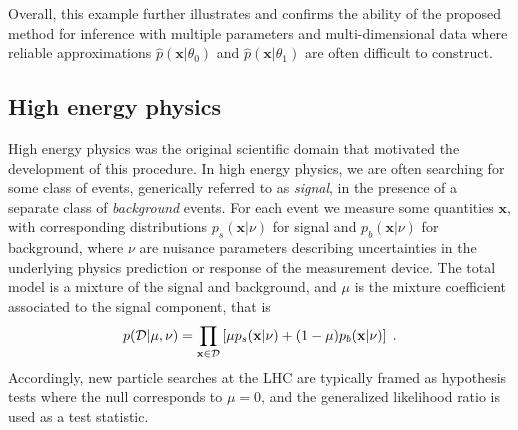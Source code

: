 \documentclass[12pt]{article}
\numberwithin{equation}{section}
\theoremstyle{plain}
\begin{document}
Overall, this example further illustrates and confirms the ability
of the proposed method for inference with multiple parameters and multi-dimensional data where
reliable approximations $\hat p(\mathbf{x}|\theta_0)$ and $\hat p(\mathbf{x}|\theta_1)$
are often difficult to construct.


\subsection{High energy physics}

High energy physics was the original scientific domain that motivated the development of this procedure.
In high energy physics, we are often searching for some class of events,
generically referred to as \textit{signal}, in the presence of a separate class
of \textit{background} events.  For each event we measure some quantities
$\mathbf{x}$, with corresponding distributions $p_s(\mathbf{x}|\nu)$ for signal
and $p_b(\mathbf{x}|\nu)$ for background,  where $\nu$ are nuisance
parameters describing uncertainties in the underlying physics prediction or
response of the measurement device. The total model is a mixture of the signal
and background, and $\mu$ is the mixture coefficient associated to the signal
component, that is
\begin{equation}\label{eq:hepGen}
p( {\cal D} | \mu, \nu) = \prod_{\mathbf{x} \in {\cal D}} \left[ \mu p_s( \mathbf{x} |  \nu)  + (1-\mu) p_b( \mathbf{x} | \nu) \right] \;.
\end{equation}
Accordingly, new particle searches at the LHC are typically framed as
hypothesis tests where the null corresponds to $\mu=0$, and the generalized
likelihood ratio is used as a test statistic.

\end{document}
